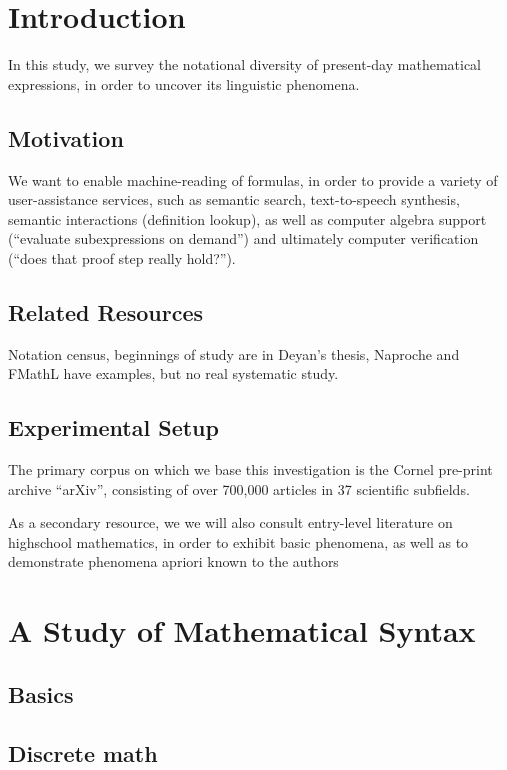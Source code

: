 \documentclass[a4paper,12pt]{memoir}
\begin{document}

\pagestyle{plain}
\setlength{\parskip}{0ex plus 0.5ex minus 0.2ex}
\tableofcontents

\chapter{Introduction}
In this study, we survey the notational diversity of present-day mathematical expressions, in order to uncover its linguistic phenomena.
\section{Motivation}
We want to enable machine-reading of formulas, in order to provide a variety of user-assistance services, such as semantic search, text-to-speech synthesis, semantic interactions (definition lookup), as well as computer algebra support (``evaluate subexpressions on demand'') and ultimately computer verification (``does that proof step really hold?'').
\section{Related Resources}
Notation census, beginnings of study are in Deyan's thesis, Naproche and FMathL have examples, but no real systematic study.

\section{Experimental Setup}
The primary corpus on which we base this investigation is the Cornel pre-print archive ``arXiv'', consisting of over 700,000 articles in 37 scientific subfields.

As a secondary resource, we we will also consult entry-level literature on highschool mathematics, in order to exhibit basic phenomena, as well as to demonstrate phenomena apriori known to the authors

\chapter{A Study of Mathematical Syntax}

\section{Basics}

\section{Discrete math}







\end{document}
